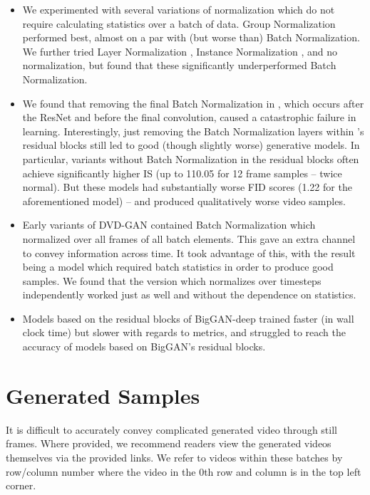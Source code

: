 \documentclass{article} \usepackage{iclr2020_conference,times}
\begin{document}
\begin{itemize}
    \item We experimented with several variations of normalization which do not require calculating statistics over a batch of data. Group Normalization \citep{wu2018group} performed best, almost on a par with (but worse than) Batch Normalization. We further tried Layer Normalization \citep{lei2016layer}, Instance Normalization \citep{ulyanov2016instance}, and no normalization, but found that these significantly underperformed Batch Normalization.
    \item We found that removing the final Batch Normalization in , which occurs after the ResNet and before the final convolution, caused a catastrophic failure in learning. Interestingly, just removing the Batch Normalization layers within 's residual blocks still led to good (though slightly worse) generative models. In particular, variants without Batch Normalization in the residual blocks often achieve significantly higher IS (up to 110.05 for  12 frame samples -- twice normal). But these models had substantially worse FID scores (1.22 for the aforementioned model) – and produced qualitatively worse video samples. 
    \item Early variants of DVD-GAN contained Batch Normalization which  normalized over all frames of all batch elements. This gave  an extra channel to convey information across time. It took advantage of this, with the result being a model which required batch statistics in order to produce good samples. We found that the version which normalizes over timesteps independently worked just as well and without the dependence on statistics.
    \item Models based on the residual blocks of BigGAN-deep trained faster (in wall clock time) but slower with regards to metrics, and struggled to reach the accuracy of models based on BigGAN's residual blocks.
\end{itemize}

\section{Generated Samples}

It is difficult to accurately convey complicated generated video through still frames. Where provided, we recommend readers view the generated videos themselves via the provided links. We refer to videos within these batches by row/column number where the video in the 0th row and column is in the top left corner.
\end{document}
